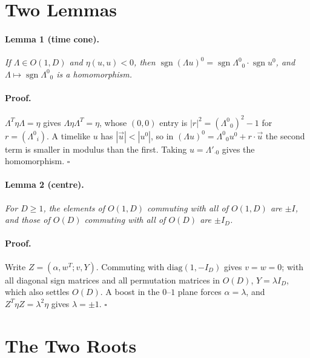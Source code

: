 \documentclass[twocolumn]{iopjournal}
\newcommand{\sgn}{\operatorname{sgn}}
\begin{document}

\section*{Two Lemmas}

\paragraph{Lemma 1 (time cone).} \textit{If $\Lambda \in O(1,D)$ and
$\eta(u,u) < 0$, then
$\sgn (\Lambda u)^0 = \sgn \Lambda^0{}_0 \cdot \sgn u^0$, and
$\Lambda \mapsto \sgn \Lambda^0{}_0$ is a homomorphism.}

\paragraph{Proof.} $\Lambda^T \eta \Lambda = \eta$ gives
$\Lambda \eta \Lambda^T = \eta$, whose $(0,0)$ entry is
$|r|^2 = (\Lambda^0{}_0)^2 - 1$ for $r = (\Lambda^0{}_i)$. A timelike
$u$ has $|\vec u| < |u^0|$, so in
$(\Lambda u)^0 = \Lambda^0{}_0 u^0 + r \cdot \vec u$ the second term
is smaller in modulus than the first. Taking $u = \Lambda'_{\cdot 0}$
gives the homomorphism. \hfill $\square$

\paragraph{Lemma 2 (centre).} \textit{For $D \ge 1$, the elements of
$O(1,D)$ commuting with all of $O(1,D)$ are $\pm I$, and those of
$O(D)$ commuting with all of $O(D)$ are $\pm I_D$.}

\paragraph{Proof.} Write $Z = (\alpha, w^T; v, Y)$. Commuting with
$\mathrm{diag}(1, -I_D)$ gives $v = w = 0$; with all diagonal sign
matrices and all permutation matrices in $O(D)$, $Y = \lambda I_D$,
which also settles $O(D)$. A boost in the $0$--$1$ plane forces
$\alpha = \lambda$, and $Z^T \eta Z = \lambda^2 \eta$ gives
$\lambda = \pm 1$. \hfill $\square$


\section*{The Two Roots}
\end{document}
